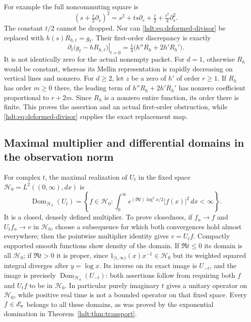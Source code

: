For example the full noncommuting square is
\begin{equation}\label{hdt:eq:noncommuting-square}
\left(s+\tfrac t2\partial_s\right)^2
=s^2+t s\partial_s+\tfrac t2+\tfrac{t^2}{4}\partial_s^2.
\end{equation}
The constant $t/2$ cannot be dropped. Nor can
\eqref{hdt:eq:deformed-divisor} be replaced with $h(s)R_{h,t}=g_t$.
Their first-order discrepancy is exactly
\begin{equation}\label{hdt:eq:discrepancy}
\left.\partial_t\bigl(g_t-hR_{h,t}\bigr)\right|_{t=0}
=\tfrac14\bigl(h''R_h+2h'R_h'\bigr).
\end{equation}
It is not identically zero for the actual nonempty packet.
For $d=1$, otherwise $R_h$ would be constant, whereas its Mellin
representation is rapidly decreasing on vertical lines and nonzero.
For $d\geq2$, let $z$ be a zero of $h'$ of order $r\geq1$.
If $R_h$ has order $m\geq0$ there, the leading term of
$h''R_h+2h'R_h'$ has nonzero coefficient proportional to $r+2m$.
Since $R_h$ is a nonzero entire function, its order there is finite.
This proves the assertion and an actual first-order obstruction,
while \eqref{hdt:eq:deformed-divisor} supplies the exact replacement map.

\subsection{Maximal multiplier and differential domains in the observation norm}
For complex $t$, the maximal realization of $U_t$ in the fixed
space $\mathcal H_0=L^2((0,\infty),dx)$ is
\begin{equation}\label{hdt:eq:maximal-multiplier}
\operatorname{Dom}_{\mathcal H_0}(U_t)=
\left\{f\in\mathcal H_0:\int_0^\infty
e^{(\Re t)\log^2x/2}|f(x)|^2\,dx<\infty\right\}.
\end{equation}
It is a closed, densely defined multiplier. To prove closedness,
if $f_n\to f$ and $U_tf_n\to v$ in $\mathcal H_0$, choose a subsequence
for which both convergences hold almost everywhere; then the
pointwise multiplier identity gives $v=U_tf$. Compactly supported
smooth functions show density of the domain. If $\Re t\leq0$ its
domain is all $\mathcal H_0$; if $\Re t>0$ it is proper, since
$1_{[1,\infty)}(x)x^{-1}\in\mathcal H_0$ but its weighted squared integral
diverges after $y=\log x$. Its inverse on its exact image is $U_{-t}$,
and the image is precisely $\operatorname{Dom}_{\mathcal H_0}(U_{-t})$:
both assertions follow from requiring both $f$ and $U_tf$ to be in
$\mathcal H_0$. In particular purely imaginary $t$ gives a unitary operator
on $\mathcal H_0$, while positive real time is not a bounded operator on
that fixed space. Every $f\in\mathscr E_\pi$ belongs to all these domains,
as was proved by the exponential domination in
Theorem~\ref{hdt:thm:transport}.

